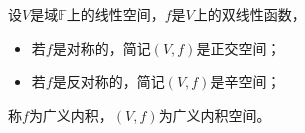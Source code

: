 \begin{definition}{}
设$V$是域$\mathbb F$上的线性空间，$f$是$V$上的双线性函数，
\begin{itemize}
\item 若$f$是对称的，简记$(V,f)$是正交空间；
\item 若$f$是反对称的，简记$(V,f)$是辛空间；
\end{itemize}
称$f$为广义内积，$(V,f)$为广义内积空间。
\end{definition}

